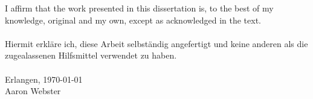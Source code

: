 I affirm that the work presented in this dissertation is, to the best of my
knowledge, original and my own, except as acknowledged in the
text. \\
\\
Hiermit erkläre ich, diese Arbeit selbständig angefertigt und keine anderen
als die zugealassenen Hilfsmittel verwendet zu haben.
\\
\hfill\\[1cm]
Erlangen, \today
\hfill\\[1cm]
Aaron Webster
\vspace{2cm}

\newpage
